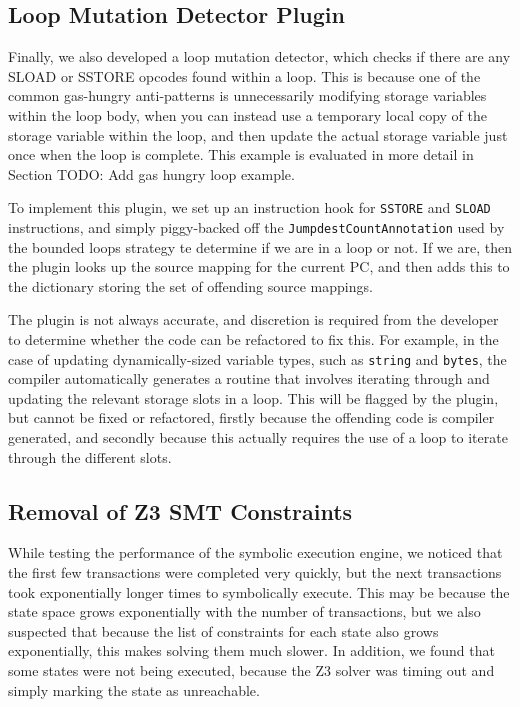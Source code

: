 \subsection{Loop Mutation Detector Plugin}

Finally, we also developed a loop mutation detector, which checks if there are any SLOAD or SSTORE
opcodes found within a loop. This is because one of the common gas-hungry anti-patterns is unnecessarily
modifying storage variables within the loop body, when you can instead use a temporary local copy of the storage 
variable within the loop, and then update the actual storage variable just once when the loop is complete. This example is evaluated
in more detail in Section TODO: Add gas hungry loop example. 

To implement this plugin, we set up an instruction hook for \texttt{SSTORE} and \texttt{SLOAD}
instructions, and simply piggy-backed off the \texttt{JumpdestCountAnnotation} used by
the bounded loops strategy te determine if we are in a loop or not. If we are, then the plugin looks
up the source mapping for the current PC, and then adds this to the dictionary storing the set of 
offending source mappings.

The plugin is not always accurate, and discretion is required from the developer to determine whether 
the code can be refactored to fix this. For example, in the case of updating dynamically-sized variable types,
such as \texttt{string} and \texttt{bytes}, the compiler automatically generates a routine that involves
iterating through and updating the relevant storage slots in a loop. This will be flagged by the plugin, 
but cannot be fixed or refactored, firstly because the offending code is compiler generated, and secondly 
because this actually requires the use of a loop to iterate through the different slots.

\subsection{Removal of Z3 SMT Constraints}

While testing the performance of the symbolic execution engine, we noticed that the first few transactions
were completed very quickly, but the next transactions took exponentially longer times to symbolically execute.
This may be because the state space grows exponentially with the number of transactions, but we also suspected
that because the list of constraints for each state also grows exponentially, this makes solving them much slower.
In addition, we found that some states were not being executed, because the Z3 solver was timing out and simply
marking the state as unreachable.

